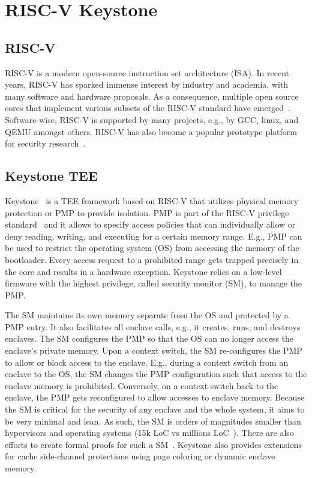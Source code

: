\section{RISC-V Keystone}

\subsection{RISC-V}
RISC-V is a modern open-source instruction set architecture (ISA). In recent years, RISC-V has sparked immense interest by industry and academia, with many software and hardware proposals. As a consequence, multiple open source cores that implement various subsets of the RISC-V standard have emerged~\cite{ariane,asanovic2016rocket,riscy,asanovic2015boom}. Software-wise, RISC-V is supported by many projects, e.g., by GCC, linux, and QEMU amongst others. RISC-V has also become a popular prototype platform for security research~\cite{weiser2019timber,costan2016sanctum,keystone}.


\subsection{Keystone TEE}

Keystone~\cite{keystone} is a TEE framework based on RISC-V that utilizes physical memory protection or PMP to provide isolation. PMP is part of the RISC-V privilege standard~\cite{riscv2019privspec} and it allows to specify access policies that can individually allow or deny reading, writing, and executing for a certain memory range. E.g., PMP can be used to restrict the operating system (OS) from accessing the memory of the bootloader. Every access request to a prohibited range gets trapped precisely in the core and results in a hardware exception. Keystone relies on a low-level firmware with the highest privilege, called security monitor (SM), to manage the PMP. 

The SM maintains its own memory separate from the OS and protected by a PMP entry. It also facilitates all enclave calls, e.g., it creates, runs, and destroys enclaves. The SM configures the PMP so that the OS can no longer access the enclave's private memory. Upon a context switch, the SM re-configures the PMP to allow or block access to the enclave. E.g., during a context switch from an enclave to the OS, the SM changes the PMP configuration such that access to the enclave memory is prohibited. Conversely, on a context switch back to the enclave, the PMP gets reconfigured to allow accesses to enclave memory. 
Because the SM is critical for the security of any enclave and the whole system, it aims to be very minimal and lean. As such, the SM is orders of magnitudes smaller than hypervisors and operating systems (15k LoC vs millions LoC~\cite{torvalds2020linux,barham2003xen}). There are also efforts to create formal proofs for such a SM~\cite{lebedev2019sanctorum}. Keystone also provides extensions for cache side-channel protections using page coloring or dynamic enclave memory. 

